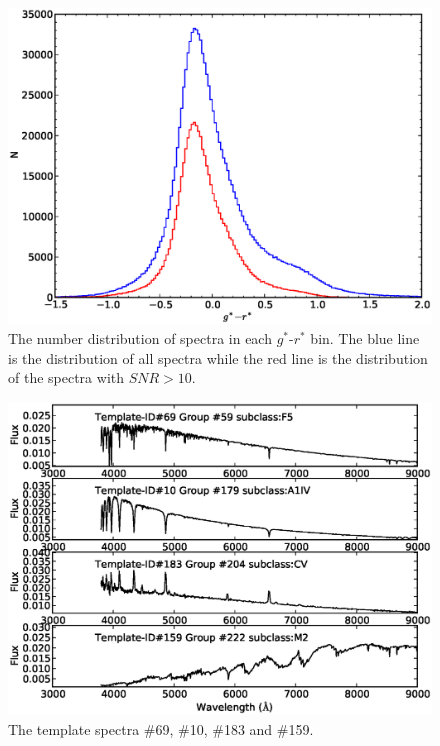 \documentclass[manuscript]{aastex}
\begin{document}
    \begin{figure}
   \centering
   \includegraphics[width=14cm, angle=0,clip]{f2.eps}
   \caption{The number distribution of spectra in each $g^*$-$r^*$ bin.
   The blue line is the distribution of all spectra while the red line is the distribution of the spectra with $SNR>10$.
   }
   \label{Fig4}
   \end{figure}

    \begin{figure}
   \centering
   \includegraphics[width=14cm, angle=0,clip]{f6.eps}
   \caption{The template spectra \#69, \#10, \#183 and \#159.
   }
   \label{Fig6}
\end{figure}
\end{document}

